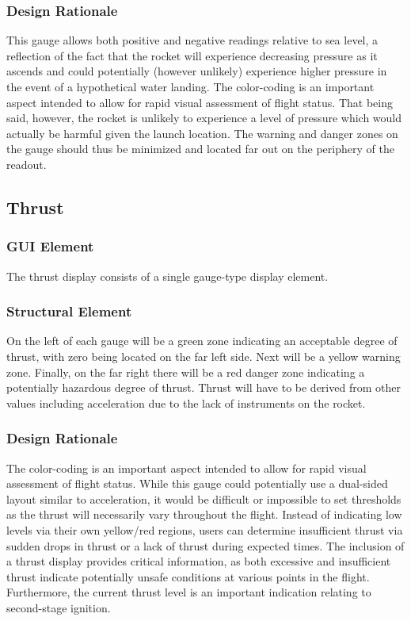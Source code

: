 \documentclass[journal,10pt,onecolumn,compsoc]{IEEEtran}
\begin{document}
		\subsubsection{Design Rationale}
			This gauge allows both positive and negative readings relative to sea level, a reflection of the fact that the rocket will experience decreasing pressure as it ascends and could potentially (however unlikely) experience higher pressure in the event of a hypothetical water landing.
			The color-coding is an important aspect intended to allow for rapid visual assessment of flight status.
			That being said, however, the rocket is unlikely to experience a level of pressure which would actually be harmful given the launch location.
			The warning and danger zones on the gauge should thus be minimized and located far out on the periphery of the readout.

	\subsection{Thrust}

		\subsubsection{GUI Element}
			The thrust display consists of a single gauge-type display element.

		\subsubsection{Structural Element}
			On the left of each gauge will be a green zone indicating an acceptable degree of thrust, with zero being located on the far left side.
			Next will be a yellow warning zone.
			Finally, on the far right there will be a red danger zone indicating a potentially hazardous degree of thrust.
			Thrust will have to be derived from other values including acceleration due to the lack of instruments on the rocket.

		\subsubsection{Design Rationale}
			The color-coding is an important aspect intended to allow for rapid visual assessment of flight status.
			While this gauge could potentially use a dual-sided layout similar to acceleration, it would be difficult or impossible to set thresholds as the thrust will necessarily vary throughout the flight.
			Instead of indicating  low levels via their own yellow/red regions, users can determine insufficient thrust via sudden drops in thrust or a lack of thrust during expected times.
			The inclusion of a thrust display provides critical information, as both excessive and insufficient thrust indicate potentially unsafe conditions at various points in the flight.
			Furthermore, the current thrust level is an important indication relating to second-stage ignition.
			
\end{document}
